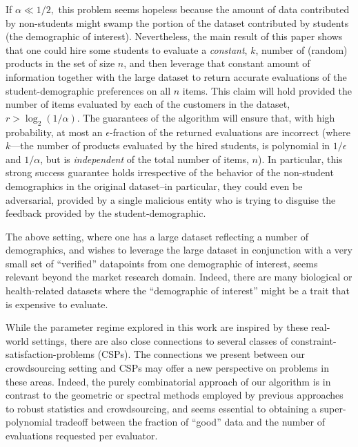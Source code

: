 \documentclass[anon,12pt]{colt2018}
\newcommand{\eps}{\epsilon}
\begin{document}
If $\alpha \ll 1/2,$ this problem seems hopeless because the amount of data contributed by non-students might swamp the portion of the dataset contributed by students (the demographic of interest).  Nevertheless, the main result of this paper shows that one could hire some students to evaluate a \emph{constant}, $k$, number of (random) products in the set of size $n$, and then leverage that constant amount of information together with the large dataset to return accurate evaluations of the student-demographic preferences on all $n$ items.  This claim will hold provided the number of items evaluated by each of the customers in the dataset, $r > \log_2 (1/\alpha)$.  The guarantees of the algorithm will ensure that, with high probability, at most an $\eps$-fraction of the returned evaluations are incorrect (where $k$---the number of products evaluated by the hired students, is polynomial in $1/\eps$ and $1/\alpha$, but is \emph{independent} of the total number of items, $n$).  In particular, this strong success guarantee holds irrespective of the behavior of the non-student demographics in the original dataset--in particular, they could even be adversarial, provided by a single malicious entity who is trying to disguise the feedback provided by the student-demographic.

The above setting, where one has a large dataset reflecting a number of demographics, and wishes to leverage the large dataset in conjunction with a very small set of ``verified'' datapoints from one demographic of interest, seems relevant beyond the market research domain. Indeed, there are many biological or health-related datasets where the ``demographic of interest'' might be a trait that is expensive to evaluate.  

While the parameter regime explored in this work are inspired by these real-world settings, there are also close connections to several classes of constraint-satisfaction-problems (CSPs).  The connections we present between our crowdsourcing setting and CSPs may offer a new perspective on problems in these areas. Indeed, the purely combinatorial approach of our algorithm is in contrast to the geometric or spectral methods employed by previous approaches to robust statistics and crowdsourcing, and seems essential to obtaining a super-polynomial tradeoff between the fraction of ``good'' data and the number of evaluations requested per evaluator.

\end{document}
